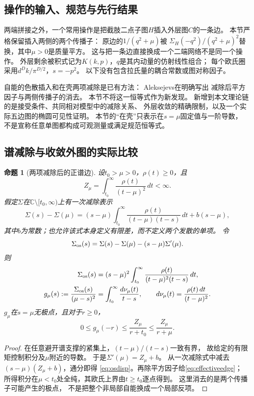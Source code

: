 \documentclass[11pt,a4paper]{ctexart}
\theoremstyle{cnplain}\newtheorem{theorem}{定理}[section]
\newtheorem{proposition}[theorem]{命题}
\theoremstyle{definition}\newtheorem{definition}[theorem]{定义}
\theoremstyle{remark}\newtheorem{remark}[theorem]{注}
\begin{document}
\subsection{操作的输入、规范与先行结果}
两端拼接之外，一个常用操作是把截肢二点子图$H$插入外层图$C$的一条边。
本节严格保留插入两侧的两个传播子：
原边的$1/(q^2+\mu)$被
$\Sigma_H(-q^2)/(q^2+\mu)^2$替换，其中$\mu>0$是质量平方。
这与把一条边直接换成一个二端网络不是同一个操作。
外层剩余被积式记为$K(k,p)$，$q$是其内动量的仿射线性组合；
每个欧氏圈采用$d^Dk/\pi^{D/2}$，$s=-p^2$。
以下没有包含拉氏量的耦合常数或图对称因子。

自能的色散插入和在壳两项减除是已有方法：
Aleksejevs在\cite[\S II.A, 式(15)]{Aleksejevs}明确写出
减除后平方因子与两侧传播子的消去。
本节不将这一恒等式作为新发现。
新增到本文理论链的是接受条件、共同相对模型中的减除关系、
外层收敛的精确限制，以及一个实际五边图的椭圆可见性证明。
本节的“在壳”只表示在$s=\mu$固定值与一阶导数，
不是宣称任意单图都构成可观测量或满足规范恒等式。

\subsection{谱减除与收敛外图的实际比较}
\begin{proposition}[两项减除后的正谱边]\label{prop:subtractededge}
设$t_0>\mu>0$，$\rho(t)\geq0$，且
\[
 Z_\mu=\int_{t_0}^{\infty}\frac{\rho(t)}{(t-\mu)^2}\,dt<\infty.
\]
假定$\Sigma$在$\mathbb C\setminus[t_0,\infty)$上有一次减除表示
\[
 \Sigma(s)-\Sigma(\mu)
 =(s-\mu)\int_{t_0}^{\infty}
       \frac{\rho(t)}{(t-\mu)(t-s)}\,dt+b(s-\mu),
\]
其中$b$为常数；也允许该式本身定义有限差，而不定义两个发散的单项。
令
\[
 \Sigma_{\rm os}(s)=\Sigma(s)-\Sigma(\mu)-(s-\mu)\Sigma'(\mu).
\]
则
\begin{align}
 \Sigma_{\rm os}(s)
  &=(s-\mu)^2\int_{t_0}^{\infty}
       \frac{\rho(t)}{(t-\mu)^2(t-s)}\,dt,\label{eq:osdisp}\\
 g_\mu(s):=\frac{\Sigma_{\rm os}(s)}{(\mu-s)^2}
  &=\int_{t_0}^{\infty}\frac{d\nu_\mu(t)}{t-s},
  \qquad d\nu_\mu(t)=\frac{\rho(t)\,dt}{(t-\mu)^2}.
 \label{eq:effectiveedge}
\end{align}
$g_\mu$在$s=\mu$无极点，且对于$r\geq0$，
\[
 0\leq g_\mu(-r)\leq\frac{Z_\mu}{r+t_0}
                        \leq\frac{Z_\mu}{r+\mu}.
\]
\end{proposition}
\begin{proof}
在任意避开谱支撑的紧集上，$(t-\mu)/(t-s)$一致有界，
故给定的有限矩控制积分及$\mu$附近的导数。
于是$\Sigma'(\mu)=Z_\mu+b$。
从一次减除式中减去$(s-\mu)(Z_\mu+b)$，通分即得
\eqref{eq:osdisp}。再除平方因子给\eqref{eq:effectiveedge}；
所得积分在$\mu<t_0$处全纯，其欧氏上界由$t\geq t_0$逐点得到。
这里消去的是两个传播子可能产生的极点，
不是把整个非局部自能换成一个局部反项。
\end{proof}
\end{document}
